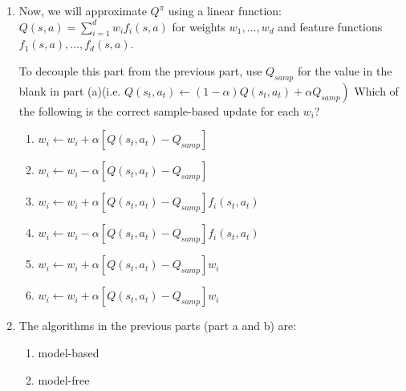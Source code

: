 \documentclass[11pt, answers]{exam}
\begin{document}
\begin{enumerate}
\begin{enumerate}
\item Now, we will approximate $Q^{\pi}$ using a linear function:$Q(s, a)=\sum_{i=1}^{d} w_{i} f_{i}(s, a)$ for weights $w_{1}, \dots, w_{d}$ and feature functions $f_{1}(s, a), \ldots, f_{d}(s, a)$.

To decouple this part from the previous part, use $Q_{samp}$ for the value in the blank in part (a)(i.e. $\left.Q\left(s_{t}, a_{t}\right) \leftarrow(1-\alpha) Q\left(s_{t}, a_{t}\right)+\alpha Q_{s a m p}\right)$
Which of the following is the correct sample-based update for each $w_i$?
\begin{enumerate}
\item $w_{i} \leftarrow w_{i}+\alpha\left[Q\left(s_{t}, a_{t}\right)-Q_{s a m p}\right]$

\item $w_{i} \leftarrow w_{i}-\alpha\left[Q\left(s_{t}, a_{t}\right)-Q_{s a m p}\right]$

\item $w_{i} \leftarrow w_{i}+\alpha\left[Q\left(s_{t}, a_{t}\right)-Q_{s a m p}\right] f_{i}\left(s_{t}, a_{t}\right)$

\item $w_{i} \leftarrow w_{i}-\alpha\left[Q\left(s_{t}, a_{t}\right)-Q_{s a m p}\right] f_{i}\left(s_{t}, a_{t}\right)$

\item $w_{i} \leftarrow w_{i}+\alpha\left[Q\left(s_{t}, a_{t}\right)-Q_{s a m p}\right]w_i$

\item $w_{i} \leftarrow w_{i}+\alpha\left[Q\left(s_{t}, a_{t}\right)-Q_{s a m p}\right]w_i$
\end{enumerate}

\item The algorithms in the previous parts (part a and b) are:
\begin{enumerate}
\item model-based
\item model-free
\end{enumerate}
\end{enumerate}
\end{enumerate}
\end{document}
